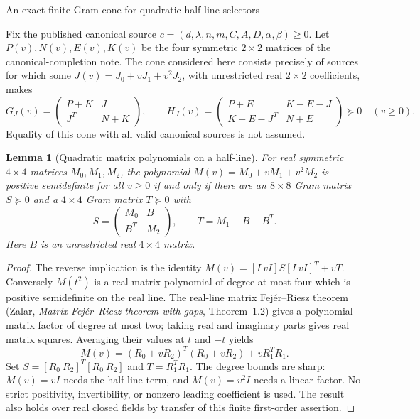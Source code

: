 \documentclass[10pt]{article}
\newtheorem{lemma}{Lemma}
\begin{document}
\begin{center}\large An exact finite Gram cone for quadratic half-line selectors\end{center}

Fix the published canonical source
$c=(d,\lambda,n,m,C,A,D,\alpha,\beta)\ge0$. Let $P(v),N(v),E(v),K(v)$
be the four symmetric $2\times2$ matrices of the canonical-completion note.
The cone considered here consists precisely of sources for which some
$J(v)=J_0+vJ_1+v^2J_2$, with unrestricted real $2\times2$ coefficients,
makes
\[
 G_J(v)=\begin{pmatrix}P+K&J\\J^T&N+K\end{pmatrix},\qquad
 H_J(v)=\begin{pmatrix}P+E&K-E-J\\K-E-J^T&N+E\end{pmatrix}
 \succeq0\quad(v\ge0).                                      \tag{1}
\]
Equality of this cone with all valid canonical sources is not assumed.

\begin{lemma}[Quadratic matrix polynomials on a half-line]
For real symmetric $4\times4$ matrices $M_0,M_1,M_2$, the polynomial
$M(v)=M_0+vM_1+v^2M_2$ is positive semidefinite for all $v\ge0$ if and
only if there are an $8\times8$ Gram matrix $S\succeq0$ and a
$4\times4$ Gram matrix $T\succeq0$ with
\[
 S=\begin{pmatrix}M_0&B\\B^T&M_2\end{pmatrix},\qquad
 T=M_1-B-B^T.                                               \tag{2}
\]
Here $B$ is an unrestricted real $4\times4$ matrix.
\end{lemma}
\begin{proof}
The reverse implication is the identity
$M(v)=[I\ vI]S[I\ vI]^T+vT$.
Conversely $M(t^2)$ is a real matrix polynomial of degree at most four
which is positive semidefinite on the real line. The real-line matrix
Fej\'er--Riesz theorem (Zalar, \emph{Matrix Fej\'er--Riesz theorem with gaps},
Theorem~1.2) gives a polynomial matrix factor of degree at most
two; taking real and imaginary parts gives real matrix squares.
Averaging their values at $t$ and $-t$ yields
\[
 M(v)=(R_0+vR_2)^T(R_0+vR_2)+vR_1^TR_1.
\]
Set $S=[R_0\ R_2]^T[R_0\ R_2]$ and $T=R_1^TR_1$.
The degree bounds are sharp: $M(v)=vI$ needs the half-line term,
and $M(v)=v^2I$ needs a linear factor. No strict positivity, invertibility,
or nonzero leading coefficient is used. The result also holds over real
closed fields by transfer of this finite first-order assertion.
\end{proof}
\end{document}
